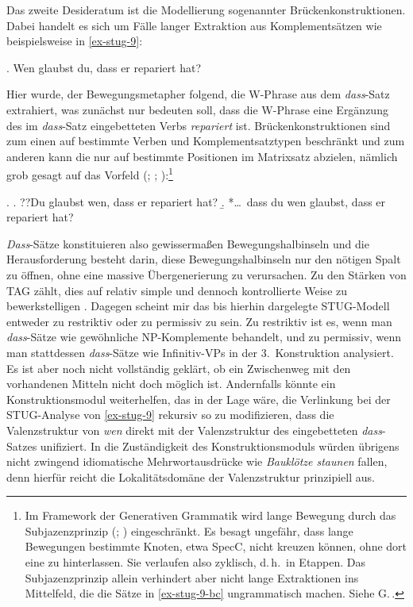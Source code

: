 Das zweite Desideratum ist die Modellierung sogenannter Brückenkonstruktionen. Dabei handelt es sich um  Fälle langer Extraktion aus Komplementsätzen wie beispielsweise in \ref{ex-stug-9}: 

\ex. \label{ex-stug-9} Wen glaubst du, dass er repariert hat?

Hier wurde, der Bewegungsmetapher folgend, die W-Phrase aus dem \textit{dass}-Satz extrahiert, was zunächst nur bedeuten soll, dass die W-Phrase eine Ergänzung des im \emph{dass}-Satz eingebetteten Verbs {\it repariert} ist. Brückenkonstruktionen sind zum einen auf bestimmte Verben und Komplementsatztypen beschränkt und zum anderen kann die  nur auf bestimmte Positionen im Matrixsatz abzielen, nämlich grob gesagt auf das Vorfeld (\citealt[Abschnitt~4.2.1.2]{Kvam:83}; \citealt{Luehr:88}; \citealt[Abschnitt~1.2]{Lutz:04}):\footnote{Im Framework der Generativen Grammatik wird lange Bewegung durch das Subjazenzprinzip (\citealt{Chomsky:73}; \citealt[Kapitel~6]{Chomsky:86}) eingeschränkt. Es besagt ungefähr, dass lange Bewegungen bestimmte Knoten, etwa SpecC, nicht kreuzen können, ohne dort eine  zu hinterlassen. Sie verlaufen also zyklisch, d.\,h.\ in Etappen. Das Subjazenzprinzip allein verhindert aber nicht lange Extraktionen ins Mittelfeld, die die Sätze in \ref{ex-stug-9-bc} ungrammatisch machen. Siehe G.\,\cite{Mueller:Sternefeld:93}.}

\ex. \label{ex-stug-9-bc}
\a. ??Du glaubst wen, dass er repariert hat?\label{ex-stug-9-b} 
\b. *\ldots\ dass du wen glaubst, dass er repariert hat?\label{ex-stug-9-c} 

\textit{Dass}-Sätze konstituieren also gewissermaßen Bewegungshalbinseln und die Herausforderung besteht darin, diese Bewegungshalbinseln nur den nötigen Spalt zu öffnen, ohne eine massive Übergenerierung zu verursachen. Zu den Stärken von TAG zählt, dies auf relativ simple und dennoch kontrollierte Weise zu bewerkstelligen \citep{Kroch:89,Frank:06}. Dagegen scheint mir das bis hierhin dargelegte STUG-Modell entweder zu restriktiv oder zu permissiv zu sein. Zu restriktiv ist es, wenn man \textit{dass}-Sätze wie gewöhnliche NP-Komplemente behandelt, und zu permissiv, wenn man stattdessen \textit{dass}-Sätze wie Infinitiv-VPs in der 3.~Konstruktion analysiert. Es ist aber noch nicht vollständig geklärt, ob ein Zwischenweg mit den vorhandenen Mitteln nicht doch möglich ist. Andernfalls könnte ein Konstruktionsmodul weiterhelfen, das in der Lage wäre, die Verlinkung bei der STUG-Analyse von \ref{ex-stug-9} rekursiv so zu modifizieren, dass die Valenzstruktur von {\it wen} direkt mit der Valenzstruktur des eingebetteten \emph{dass}-Satzes unifiziert. In die Zuständigkeit des Konstruktionsmoduls würden übrigens nicht zwingend idiomatische Mehrwortausdrücke wie {\it Bauklötze staunen} fallen, denn hierfür reicht die Lokalitätsdomäne der Valenzstruktur prinzipiell aus.


